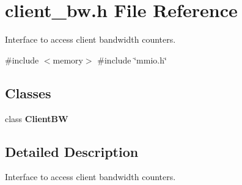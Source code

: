 \section{client\+\_\+bw.\+h File Reference}
\label{client__bw_8h}


Interface to access client bandwidth counters.  


{\ttfamily \#include $<$memory$>$}\newline
{\ttfamily \#include \char`\"{}mmio.\+h\char`\"{}}\newline
\subsection*{Classes}
\begin{DoxyCompactItemize}
\item 
class \textbf{ Client\+BW}
\end{DoxyCompactItemize}


\subsection{Detailed Description}
Interface to access client bandwidth counters. 


